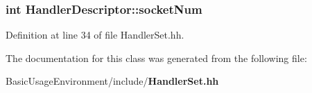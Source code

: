 \subsubsection[{socket\+Num}]{\setlength{\rightskip}{0pt plus 5cm}int Handler\+Descriptor\+::socket\+Num}\label{classHandlerDescriptor_a23cfb00276c285fa6023484428642b2c}


Definition at line 34 of file Handler\+Set.\+hh.



The documentation for this class was generated from the following file\+:\begin{DoxyCompactItemize}
\item 
Basic\+Usage\+Environment/include/{\bf Handler\+Set.\+hh}\end{DoxyCompactItemize}
